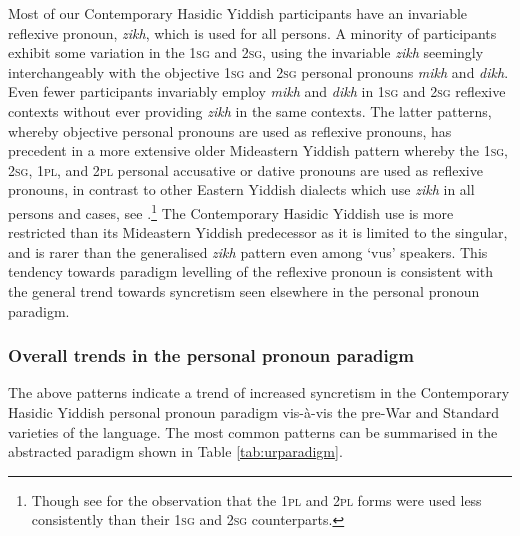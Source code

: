 \documentclass[output=paper, hidelinks]{langscibook}
\begin{document}
Most of our Contemporary Hasidic Yiddish participants have an invariable reflexive pronoun, \textit{zikh}, which is used for all persons. A minority of participants exhibit some variation in the 1\textsc{sg} and 2\textsc{sg}, using the invariable \textit{zikh} seemingly interchangeably with the objective 1\textsc{sg} and 2\textsc{sg} personal pronouns \textit{mikh} and \textit{dikh}. Even fewer participants invariably employ \textit{mikh} and \textit{dikh} in 1\textsc{sg} and 2\textsc{sg} reflexive contexts without ever providing \textit{zikh} in the same contexts. The latter patterns, whereby objective personal pronouns are used as reflexive pronouns, has precedent in a more extensive older Mideastern Yiddish pattern whereby the 1\textsc{sg}, 2\textsc{sg}, 1\textsc{pl}, and 2\textsc{pl} personal accusative or dative pronouns are used as reflexive pronouns, in contrast to other Eastern Yiddish dialects which use \textit{zikh} in all persons and cases, see \citet[184--185]{Jacobs05}.\footnote{Though see \citet[125--126]{Katz87} for the observation that the 1\textsc{pl} and 2\textsc{pl} forms were used less consistently than their 1\textsc{sg} and 2\textsc{sg} counterparts.} The Contemporary Hasidic Yiddish use is more restricted than its Mideastern Yiddish predecessor as it is limited to the singular, and is rarer than the generalised \textit{zikh} pattern even among ‘vus’ speakers. This tendency towards paradigm levelling of the reflexive pronoun is consistent with the general trend towards syncretism seen elsewhere in the personal pronoun paradigm.

\subsubsection{Overall trends in the personal pronoun paradigm}

The above patterns indicate a trend of increased syncretism in the Contemporary Hasidic Yiddish personal pronoun paradigm vis-à-vis the pre-War and Standard varieties of the language. The most common patterns can be summarised in the abstracted paradigm shown in Table \ref{tab:urparadigm}.
\end{document}
